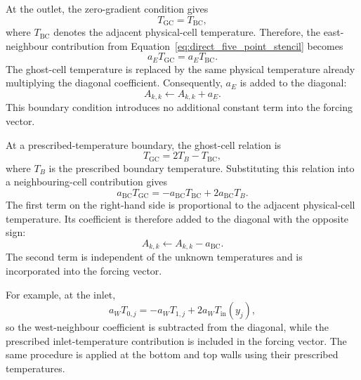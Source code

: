 At the outlet, the zero-gradient condition gives
\begin{equation}
T_{\mathrm{GC}}=T_{\mathrm{BC}},
\label{eq:direct_outlet_ghost}
\end{equation}
where $T_{\mathrm{BC}}$ denotes the adjacent physical-cell
temperature. Therefore, the east-neighbour contribution from Equation~\eqref{eq:direct_five_point_stencil}
becomes
\begin{equation}
a_E T_{\mathrm{GC}}=a_E T_{\mathrm{BC}}.
\label{eq:direct_outlet_contribution}
\end{equation}
The ghost-cell temperature is replaced by the same physical
temperature already multiplying the diagonal coefficient.
Consequently, $a_E$ is added to the diagonal:
\begin{equation}
A_{k,k}\gets A_{k,k}+a_E.
\label{eq:direct_outlet_diagonal}
\end{equation}
This boundary condition introduces no additional constant
term into the forcing vector.

At a prescribed-temperature boundary, the ghost-cell relation is
\begin{equation}
T_{\mathrm{GC}}=2T_B-T_{\mathrm{BC}},
\label{eq:direct_dirichlet_ghost}
\end{equation}
where $T_B$ is the prescribed boundary temperature. Substituting
this relation into a neighbouring-cell contribution gives
\begin{equation}
\boxed{
a_{\mathrm{BC}}T_{\mathrm{GC}}
=
-a_{\mathrm{BC}}T_{\mathrm{BC}}
+2a_{\mathrm{BC}}T_B.
}
\label{eq:direct_dirichlet_contribution}
\end{equation}
The first term on the right-hand side is proportional to the
adjacent physical-cell temperature. Its coefficient is
therefore added to the diagonal with the opposite sign:
\begin{equation}
A_{k,k}\gets A_{k,k}-a_{\mathrm{BC}}.
\label{eq:direct_dirichlet_diagonal}
\end{equation}
The second term is independent of the unknown temperatures
and is incorporated into the forcing vector.

For example, at the inlet,
\begin{equation}
a_W T_{0,j}
=
-a_W T_{1,j}
+2a_W T_{\mathrm{in}}(y_j),
\end{equation}
so the west-neighbour coefficient is subtracted from the
diagonal, while the prescribed inlet-temperature contribution
is included in the forcing vector. The same procedure is
applied at the bottom and top walls using their prescribed
temperatures.

